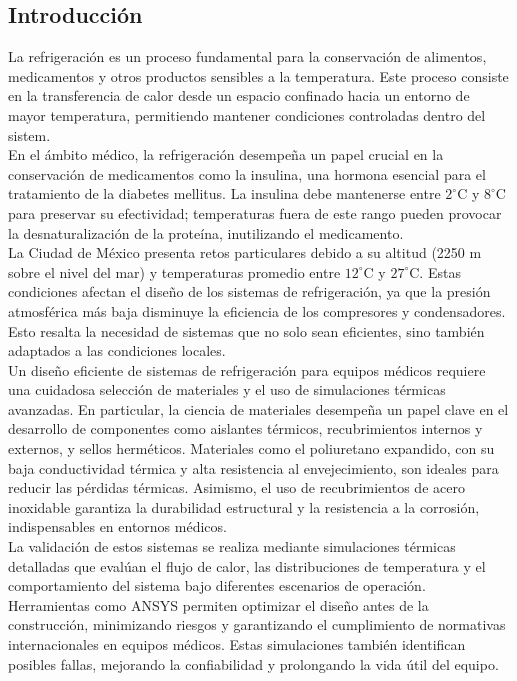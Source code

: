 \documentclass{article}
\begin{document}
\begin{multicols}{2}
	
	\section{Introducción}
La refrigeración es un proceso fundamental para la conservación de alimentos, medicamentos y otros productos sensibles a la temperatura. Este proceso consiste en la transferencia de calor desde un espacio confinado hacia un entorno de mayor temperatura, permitiendo mantener condiciones controladas dentro del sistem\cite{caloryfrio-2018}. \\

En el ámbito médico, la refrigeración desempeña un papel crucial en la conservación de medicamentos como la insulina, una hormona esencial para el tratamiento de la diabetes mellitus. La insulina debe mantenerse entre $2^\circ$C y $8^\circ$C para preservar su efectividad; temperaturas fuera de este rango pueden provocar la desnaturalización de la proteína, inutilizando el medicamento.\\
La Ciudad de México presenta retos particulares debido a su altitud (2250 m sobre el nivel del mar) y temperaturas promedio entre $12^\circ$C y $27^\circ$C. Estas condiciones afectan el diseño de los sistemas de refrigeración, ya que la presión atmosférica más baja disminuye la eficiencia de los compresores y condensadores. Esto resalta la necesidad de sistemas que no solo sean eficientes, sino también adaptados a las condiciones locales.\\
Un diseño eficiente de sistemas de refrigeración para equipos médicos requiere una cuidadosa selección de materiales y el uso de simulaciones térmicas avanzadas. En particular, la ciencia de materiales desempeña un papel clave en el desarrollo de componentes como aislantes térmicos, recubrimientos internos y externos, y sellos herméticos. Materiales como el poliuretano expandido, con su baja conductividad térmica y alta resistencia al envejecimiento, son ideales para reducir las pérdidas térmicas. Asimismo, el uso de recubrimientos de acero inoxidable garantiza la durabilidad estructural y la resistencia a la corrosión, indispensables en entornos médicos.\cite{dincer-2016}\\

La validación de estos sistemas se realiza mediante simulaciones térmicas detalladas que evalúan el flujo de calor, las distribuciones de temperatura y el comportamiento del sistema bajo diferentes escenarios de operación. Herramientas como ANSYS permiten optimizar el diseño antes de la construcción, minimizando riesgos y garantizando el cumplimiento de normativas internacionales en equipos médicos. Estas simulaciones también identifican posibles fallas, mejorando la confiabilidad y prolongando la vida útil del equipo.\cite{Dincer2010-re} \\


\end{multicols}
\end{document}
